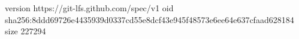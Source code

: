 version https://git-lfs.github.com/spec/v1
oid sha256:8ddd69726e4435939d0337cd55e8dcf43e945f48573e6ee64e637cfaad628184
size 227294
